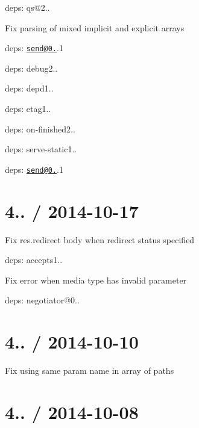 \begin{DoxyItemize}
\begin{DoxyItemize}
\end{DoxyItemize}
\item deps\+: qs@2..
\begin{DoxyItemize}
\item Fix parsing of mixed implicit and explicit arrays
\end{DoxyItemize}
\item deps\+: \href{mailto:send@0.10}{\tt send@0.}.1
\begin{DoxyItemize}
\item deps\+: debug2..
\item deps\+: depd1..
\item deps\+: etag1..
\item deps\+: on-\/finished2..
\end{DoxyItemize}
\item deps\+: serve-\/static1..
\begin{DoxyItemize}
\item deps\+: \href{mailto:send@0.10}{\tt send@0.}.1
\end{DoxyItemize}
\end{DoxyItemize}

\section*{4.. / 2014-\/10-\/17 }


\begin{DoxyItemize}
\item Fix {\ttfamily res.\+redirect} body when redirect status specified
\item deps\+: accepts1..
\begin{DoxyItemize}
\item Fix error when media type has invalid parameter
\item deps\+: negotiator@0..
\end{DoxyItemize}
\end{DoxyItemize}

\section*{4.. / 2014-\/10-\/10 }


\begin{DoxyItemize}
\item Fix using same param name in array of paths
\end{DoxyItemize}

\section*{4.. / 2014-\/10-\/08 }


